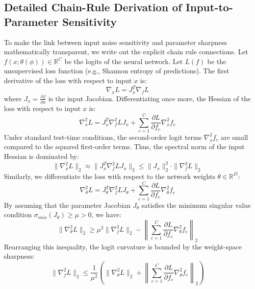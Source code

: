 \documentclass{article}
\theoremstyle{plain}
\theoremstyle{definition}
\theoremstyle{remark}
\begin{document}
\subsection{Detailed Chain-Rule Derivation of Input-to-Parameter Sensitivity}
To make the link between input noise sensitivity and parameter sharpness mathematically transparent, we write out the explicit chain rule connections.
Let $f(x; \theta(\phi)) \in \mathbb{R}^C$ be the logits of the neural network. Let $L(f)$ be the unsupervised loss function (e.g., Shannon entropy of predictions).
The first derivative of the loss with respect to input $x$ is:
\begin{equation}
    \nabla_x L = J_x^T \nabla_f L
\end{equation}
where $J_x = \frac{\partial f}{\partial x}$ is the input Jacobian. Differentiating once more, the Hessian of the loss with respect to input $x$ is:
\begin{equation}
    \nabla_x^2 L = J_x^T \nabla_f^2 L J_x + \sum_{c=1}^C \frac{\partial L}{\partial f_c} \nabla_x^2 f_c
\end{equation}
Under standard test-time conditions, the second-order logit terms $\nabla_x^2 f_c$ are small compared to the squared first-order terms. Thus, the spectral norm of the input Hessian is dominated by:
\begin{equation}
    \|\nabla_x^2 L\|_2 \approx \|J_x^T \nabla_f^2 L J_x\|_2 \le \|J_x\|_2^2 \cdot \|\nabla_f^2 L\|_2
\end{equation}
Similarly, we differentiate the loss with respect to the network weights $\theta \in \mathbb{R}^D$:
\begin{equation}
    \nabla_\theta^2 L = J_\theta^T \nabla_f^2 L J_\theta + \sum_{c=1}^C \frac{\partial L}{\partial f_c} \nabla_\theta^2 f_c
\end{equation}
By assuming that the parameter Jacobian $J_\theta$ satisfies the minimum singular value condition $\sigma_{min}(J_\theta) \ge \mu > 0$, we have:
\begin{equation}
    \|\nabla_\theta^2 L\|_2 \ge \mu^2 \|\nabla_f^2 L\|_2 - \left\| \sum_{c=1}^C \frac{\partial L}{\partial f_c} \nabla_\theta^2 f_c \right\|_2
\end{equation}
Rearranging this inequality, the logit curvature is bounded by the weight-space sharpness:
\begin{equation}
    \|\nabla_f^2 L\|_2 \le \frac{1}{\mu^2} \left( \|\nabla_\theta^2 L\|_2 + \left\| \sum_{c=1}^C \frac{\partial L}{\partial f_c} \nabla_\theta^2 f_c \right\|_2 \right)
\end{equation}
\end{document}
